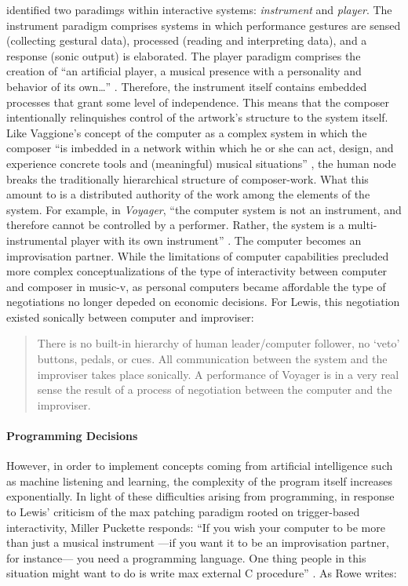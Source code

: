 \citeauthor{Row92:Int} \parencite{Row92:Int} identified two paradimgs within interactive systems: \textit{instrument} and \textit{player}. The instrument paradigm comprises systems in which performance gestures are sensed (collecting gestural data), processed (reading and interpreting data), and a response (sonic output) is elaborated. The player paradigm comprises the creation of ``an artificial player, a musical presence with a personality and behavior of its own\dots'' \parencite[Chapter~1]{Row92:Int}. Therefore, the instrument itself contains embedded processes that grant some level of independence. This means that the composer intentionally relinquishes control of the artwork's structure to the system itself. Like Vaggione's concept of the computer as a complex system in which the composer ``is imbedded in a network within which he or she can act, design, and experience concrete tools and (meaningful) musical situations'' \parencite{Vag01:Som}, the human node breaks the traditionally hierarchical structure of composer-work. What this amount to is a distributed authority of the work among the elements of the system. For example, in \textit{Voyager}, ``the computer system is not an instrument, and therefore cannot be controlled by a performer. Rather, the system is a multi-instrumental player with its own instrument'' \parencite[103]{Lew99:Int}. The computer becomes an improvisation partner. While the limitations of computer capabilities precluded more complex conceptualizations of the type of interactivity between computer and composer in \gls{music-v}, as personal computers became affordable the type of negotiations no longer depeded on economic decisions. For Lewis, this  negotiation existed sonically between computer and improviser:

\begin{quote}
	There is no built-in hierarchy of human leader/computer follower, no `veto' buttons, pedals, or cues. All communication between the system and the improviser takes place sonically. A performance of Voyager is in a very real sense the result of a process of negotiation between the computer and the improviser. \parencite[104]{Lew99:Int}
\end{quote}

\paragraph{Programming Decisions}
However, in order to implement concepts coming from artificial intelligence such as machine listening and learning, the complexity of the program itself increases exponentially. In light of these difficulties arising from programming, in response to Lewis' criticism of the \gls{max} patching paradigm rooted on trigger-based interactivity, Miller Puckette responds: ``If you wish your computer to be more than just a musical instrument ---if you want it to be an improvisation partner, for instance--- you need a programming language. One thing people in this situation might want to do is write \gls{max} external C procedure'' \parencite[8]{Lew93:Put}. As Rowe writes:


